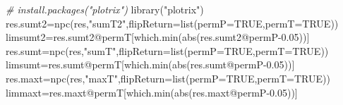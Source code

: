 \documentclass[
]{article}
\newenvironment{Shaded}{\begin{snugshade}}{\end{snugshade}}
\newcommand{\AttributeTok}[1]{\textcolor[rgb]{0.77,0.63,0.00}{#1}}
\newcommand{\CommentTok}[1]{\textcolor[rgb]{0.56,0.35,0.01}{\textit{#1}}}
\newcommand{\ConstantTok}[1]{\textcolor[rgb]{0.00,0.00,0.00}{#1}}
\newcommand{\FloatTok}[1]{\textcolor[rgb]{0.00,0.00,0.81}{#1}}
\newcommand{\FunctionTok}[1]{\textcolor[rgb]{0.00,0.00,0.00}{#1}}
\newcommand{\NormalTok}[1]{#1}
\newcommand{\OtherTok}[1]{\textcolor[rgb]{0.56,0.35,0.01}{#1}}
\newcommand{\SpecialCharTok}[1]{\textcolor[rgb]{0.00,0.00,0.00}{#1}}
\newcommand{\StringTok}[1]{\textcolor[rgb]{0.31,0.60,0.02}{#1}}
\begin{document}
\begin{Shaded}
\begin{Highlighting}[]
\CommentTok{\# install.packages("plotrix")}
\FunctionTok{library}\NormalTok{(}\StringTok{"plotrix"}\NormalTok{) }
\NormalTok{res.sumt2}\OtherTok{=}\FunctionTok{npc}\NormalTok{(res,}\StringTok{"sumT2"}\NormalTok{,}\AttributeTok{flipReturn=}\FunctionTok{list}\NormalTok{(}\AttributeTok{permP=}\ConstantTok{TRUE}\NormalTok{,}\AttributeTok{permT=}\ConstantTok{TRUE}\NormalTok{))}
\NormalTok{limsumt2}\OtherTok{=}\NormalTok{res.sumt2}\SpecialCharTok{@}\NormalTok{permT[}\FunctionTok{which.min}\NormalTok{(}\FunctionTok{abs}\NormalTok{(res.sumt2}\SpecialCharTok{@}\NormalTok{permP}\FloatTok{{-}0.05}\NormalTok{))]}
\NormalTok{res.sumt}\OtherTok{=}\FunctionTok{npc}\NormalTok{(res,}\StringTok{"sumT"}\NormalTok{,}\AttributeTok{flipReturn=}\FunctionTok{list}\NormalTok{(}\AttributeTok{permP=}\ConstantTok{TRUE}\NormalTok{,}\AttributeTok{permT=}\ConstantTok{TRUE}\NormalTok{))}
\NormalTok{limsumt}\OtherTok{=}\NormalTok{res.sumt}\SpecialCharTok{@}\NormalTok{permT[}\FunctionTok{which.min}\NormalTok{(}\FunctionTok{abs}\NormalTok{(res.sumt}\SpecialCharTok{@}\NormalTok{permP}\FloatTok{{-}0.05}\NormalTok{))]}
\NormalTok{res.maxt}\OtherTok{=}\FunctionTok{npc}\NormalTok{(res,}\StringTok{"maxT"}\NormalTok{,}\AttributeTok{flipReturn=}\FunctionTok{list}\NormalTok{(}\AttributeTok{permP=}\ConstantTok{TRUE}\NormalTok{,}\AttributeTok{permT=}\ConstantTok{TRUE}\NormalTok{))}
\NormalTok{limmaxt}\OtherTok{=}\NormalTok{res.maxt}\SpecialCharTok{@}\NormalTok{permT[}\FunctionTok{which.min}\NormalTok{(}\FunctionTok{abs}\NormalTok{(res.maxt}\SpecialCharTok{@}\NormalTok{permP}\FloatTok{{-}0.05}\NormalTok{))]}



\end{Highlighting}
\end{Shaded}
\end{document}
